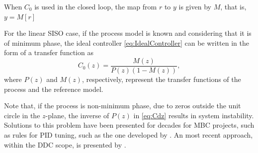 When $C_0$ is used in the closed loop, the map from $r$ to $y$ is given by $M$, that is, $y=M[r]$

For the linear SISO case, if the process model is known and considering that it is of
minimum phase, the ideal controller \eqref{eq:IdealController} can be written in the form of a transfer function as
\begin{equation}
   C_0(z) = \frac{M(z)}{P(z)\left(1-M(z)\right)},
   \label{eq:Cdz}
\end{equation}
where $P(z)$ and $M(z)$, respectively, represent the transfer functions of the process and the reference model.

Note that, if the process is non-minimum phase, due to zeros outside the unit circle in the $z$-plane, the inverse of $P(z)$ in \eqref{eq:Cdz} results in system instability. Solutions to this problem have been presented for decades for MBC projects, such as rules for PID tuning, such as the one developed by \cite{skogestad2003}.
An most recent approach, within the DDC scope, is presented by \cite{campestrini2011}.




